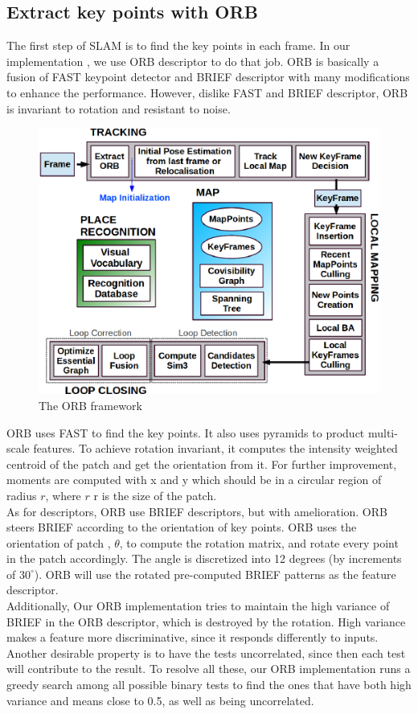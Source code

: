 \documentclass[paper=a4, fontsize=14pt]{scrartcl}
\numberwithin{equation}{section}		%
\numberwithin{figure}{section}			%
\numberwithin{table}{section}				%
\begin{document}
\subsection{Extract key points with ORB}
The first step of SLAM is to find the key points in each frame. In our implementation , we use ORB descriptor to do that job. ORB is basically a fusion of FAST\cite{rosten2006machine} keypoint detector and BRIEF\cite{calonder2010brief} descriptor with many modifications to enhance the performance. However, dislike FAST and BRIEF descriptor, ORB is invariant to rotation and resistant to noise.\\
\begin{figure}[h]
	\centering
	\includegraphics[width=.80\linewidth]{images/orb.png}
	\caption{The ORB framework}
	\label{fig:framework}
\end{figure}
\indent ORB uses FAST to find the key points. It also uses pyramids to product multi-scale features. To achieve rotation invariant, it computes the intensity weighted centroid of the patch and get the orientation from it. For further improvement, moments are computed with x and y which should be in a circular region of radius $r$, where $r$ r is the size of the patch.\\
\indent As for descriptors, ORB use BRIEF descriptors, but with amelioration. ORB steers BRIEF according to the orientation of key points. ORB uses the orientation of patch , $\theta$, to compute the rotation matrix, and rotate every point in the patch accordingly. The angle is discretized into 12 degrees (by increments of $30^\circ$). ORB will use the rotated pre-computed BRIEF patterns as the feature descriptor.\\
\indent Additionally, Our ORB implementation tries to maintain the high variance of BRIEF in the ORB descriptor, which is destroyed by the rotation. High variance makes a feature more discriminative, since it responds differently to inputs. Another desirable property is to have the tests uncorrelated, since then each test will contribute to the result. To resolve all these, our ORB implementation runs a greedy search among all possible binary tests to find the ones that have both high variance and means close to 0.5, as well as being uncorrelated.
\end{document}
